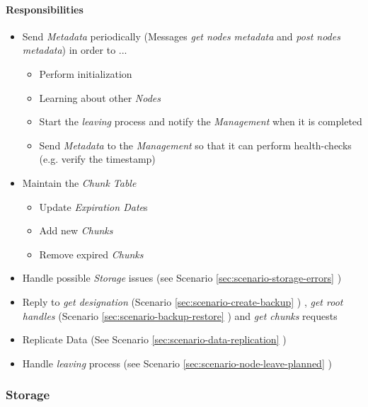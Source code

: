 \paragraph{Responsibilities}

\begin{itemize}
    \item Send \emph{Metadata} periodically (Messages \emph{get nodes metadata} and \emph{post nodes metadata}) in order to ...
    \begin{itemize}
        \item Perform initialization
        \item Learning about other \emph{Nodes}
        \item Start the \emph{leaving} process and notify the \emph{Management} when it is completed
        \item Send \emph{Metadata} to the \emph{Management} so that it can perform health-checks (e.g. verify the timestamp)
    \end{itemize}
    \item Maintain the \emph{Chunk Table}
    \begin{itemize}
        \item Update \emph{Expiration Date}s
        \item Add new \emph{Chunks}
        \item Remove expired \emph{Chunks}
    \end{itemize}
    \item Handle possible \emph{Storage} issues (see Scenario \ref{sec:scenario-storage-errors} )
    \item Reply to \emph{get designation}  (Scenario \ref{sec:scenario-create-backup} ) , \emph{get root handles} (Scenario \ref{sec:scenario-backup-restore} ) and \emph{get chunks} requests
    \item Replicate Data (See Scenario \ref{sec:scenario-data-replication} )
    \item Handle \emph{leaving} process (see Scenario \ref{sec:scenario-node-leave-planned} )
\end{itemize}

\label{sec:component-storage}
\subsubsection{Storage}

